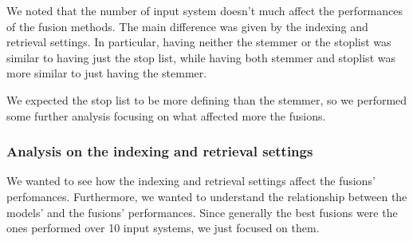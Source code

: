 	We noted that the number of input system doesn't much affect the performances of the fusion methods. The main difference was given by the indexing and retrieval settings. In particular, having neither the stemmer or the stoplist was similar to having just the stop list, while having both stemmer and stoplist was more similar to just having the stemmer.
	
	We expected the stop list to be more defining than the stemmer, so we performed some further analysis focusing on what affected more the fusions.
	
	\subsubsection{Analysis on the indexing and retrieval settings}
	We wanted to see how the indexing and retrieval settings affect the fusions' perfomances. Furthermore, we wanted to understand the relationship between the models' and the fusions' performances.
	Since generally the best fusions were the ones performed over 10 input systems, we just focused on them. 
	
